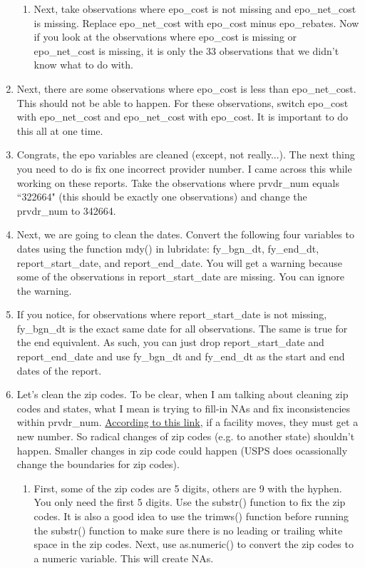 \documentclass{article}
\begin{document}
\begin{enumerate}
\begin{enumerate}
			\item Next, take observations where epo\_cost is not missing and epo\_net\_cost is missing. Replace epo\_net\_cost with epo\_cost minus epo\_rebates. Now if you look at the observations where epo\_cost is missing or epo\_net\_cost is missing, it is only the 33 observations that we didn't know what to do with.
		\end{enumerate}
		\item Next, there are some observations where epo\_cost is less than epo\_net\_cost. This should not be able to happen. For these observations, switch epo\_cost with epo\_net\_cost and epo\_net\_cost with epo\_cost. It is important to do this all at one time.
		\item Congrats, the epo variables are cleaned (except, not really...). The next thing you need to do is fix one incorrect provider number. I came across this while working on these reports. Take the observations where prvdr\_num equals ``322664" (this should be exactly one observations) and change the prvdr\_num to 342664.
		\item Next, we are going to clean the dates. Convert the following four variables to dates using the function mdy() in lubridate: fy\_bgn\_dt, fy\_end\_dt, report\_start\_date, and report\_end\_date. You will get a warning because some of the observations in report\_start\_date are missing. You can ignore the warning.
		\item If you notice, for observations where report\_start\_date is not missing, fy\_bgn\_dt is the exact same date for all observations. The same is true for the end equivalent. As such, you can just drop report\_start\_date and report\_end\_date and use fy\_bgn\_dt and fy\_end\_dt as the start and end dates of the report. 
		\item Let's clean the zip codes. To be clear, when I am talking about cleaning zip codes and states, what I mean is trying to fill-in NAs and fix inconsistencies within prvdr\_num. \href{https://www.cms.gov/Regulations-and-Guidance/Administrative-Simplification/Unique-Identifier/UniqueIdentifiersFAQs}{According to this link}, if a facility moves, they must get a new number. So radical changes of zip codes (e.g. to another state) shouldn't happen. Smaller changes in zip code could happen (USPS does ocassionally change the boundaries for zip codes).
		\begin{enumerate}
			\item First, some of the zip codes are 5 digits, others are 9 with the hyphen. You only need the first 5 digits. Use the substr() function to fix the zip codes. It is also a good idea to use the trimws() function before running the substr() function to make sure there is no leading or trailing white space in the zip codes. Next, use as.numeric() to convert the zip codes to a numeric variable. This will create NAs.

\end{enumerate}
\end{enumerate}
\end{document}
